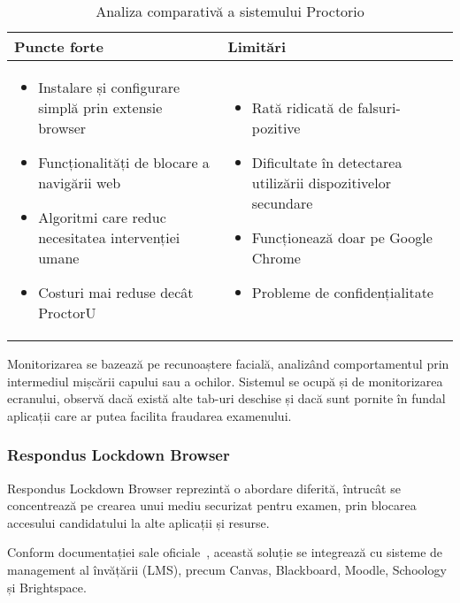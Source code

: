 \documentclass[12pt,a4paper]{article}
\begin{document}
\begin{table}[h]
\centering
\begin{tabular}{|p{8.5cm}|p{8.5cm}|}
\hline
\textbf{Puncte forte} & \textbf{Limitări} \\
\hline
\begin{itemize}
    \item Instalare și configurare simplă prin extensie browser
    \item Funcționalități de blocare a navigării web
    \item Algoritmi care reduc necesitatea intervenției umane
    \item Costuri mai reduse decât ProctorU
\end{itemize} & 
\begin{itemize}
    \item Rată ridicată de falsuri-pozitive
    \item Dificultate în detectarea utilizării dispozitivelor secundare
    \item Funcționează doar pe Google Chrome
    \item Probleme de confidențialitate
\end{itemize} \\
\hline
\end{tabular}
\caption{Analiza comparativă a sistemului Proctorio}
\end{table}

Monitorizarea se bazează pe recunoaștere facială, analizând comportamentul prin 
intermediul mișcării capului sau a ochilor. Sistemul se ocupă și de monitorizarea 
ecranului, observă dacă există alte tab-uri deschise și dacă sunt pornite în fundal 
aplicații care ar putea facilita fraudarea examenului.

\subsubsection{Respondus Lockdown Browser}
Respondus Lockdown Browser reprezintă o abordare diferită, 
întrucât se concentrează pe crearea unui mediu securizat pentru examen,
prin blocarea accesului candidatului la alte aplicații și resurse.

Conform documentației sale oficiale~\cite{respondus}, această soluție se
integrează cu sisteme de management al învățării (LMS), precum Canvas,
Blackboard, Moodle, Schoology și Brightspace.
\end{document}
